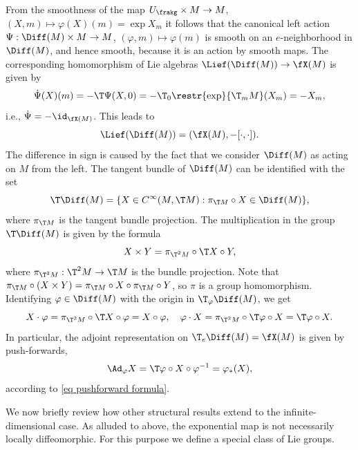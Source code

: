 \begin{example}
    From the smoothness of the map $U_\frakg\times M\to M$, $(X,m)\mapsto \varphi(X)(m)=\exp X_m$ it follows that the canonical left action $\Psi:\Diff(M)\times M\to M$, $(\varphi,m)\mapsto \varphi(m)$ is smooth on an $e$-neighborhood in $\Diff(M)$, and hence smooth, because it is an action by smooth maps. The corresponding homomorphism of Lie algebras $\Lief(\Diff(M))\to \fX(M)$ is given by
    \[\dot\Psi(X)(m)=-\T\Psi (X,0)=-\T_{0}\restr{\exp}{\T_m M}(X_m)=-X_m,\]
    i.e., $\dot\Psi=-\id_{\fX(M)}$. This leads to
    \[\Lief (\Diff(M))=(\fX(M),-[\cdot,\cdot]).\]
    The difference in sign is caused by the fact that we consider $\Diff(M)$ as acting on $M$ from the left. The tangent bundle of $\Diff(M)$ can be identified with the set
    \[\T\Diff(M)=\{X\in C^\infty(M,\T M):\pi_{\T M}\circ X\in \Diff(M)\},\]
    where $\pi_{\T M}$ is the tangent bundle projection. The multiplication in the group $\T\Diff(M)$ is given by the formula
    \[X\times Y=\pi_{\T^2M}\circ \T X\circ Y,\]
    where $\pi_{\T^2M}:\T^2M\to \T M$ is the bundle projection. Note that $\pi_{\T M}\circ (X\times Y)=\pi_{\T M}\circ X\circ \pi_{\T M}\circ Y$, so $\pi$ is a group homomorphism. Identifying $\varphi\in\Diff(M)$ with the origin in $\T_\varphi\Diff(M)$, we get 
    \[X\cdot \varphi=\pi_{\T^2M}\circ \T X\circ \varphi=X\circ \varphi,\quad \varphi\cdot X=\pi_{\T^2M}\circ \T\varphi\circ X=\T\varphi\circ X.\]
    In particular, the adjoint representation on $\T_e\Diff(M)=\fX(M)$ is given by push-forwards,
    \[\Ad_\varphi X=\T\varphi\circ X\circ \varphi^{-1}=\varphi_\ast (X),\]
    according to \eqref{eq pushforward formula}.
\end{example}


We now briefly review how other structural results extend to the infinite-dimensional case. As alluded to above, the exponential map is not necessarily locally diffeomorphic. For this purpose we define a special class of Lie groups.

